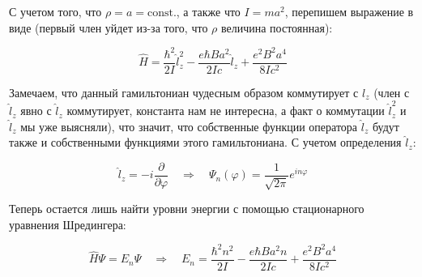 \documentclass[a4paper, 12pt]{article}
\newcommand{\qrq}
{\ensuremath{\quad \Rightarrow \quad}} %
\renewcommand{\phi}{\varphi} %
\begin{document}
С учетом того, что $\rho = a = \text{const.}$, а также что $I = m a^2$, перепишем выражение в виде (первый член уйдет из-за того, что $\rho$ величина постоянная):

\begin{equation*}
	\hat{H} = \frac{\hbar^2}{2 I}\hat{l}^2_z - \frac{e \hbar B a^2}{2 I c} \hat{l}_z + \frac{e^2 B^2 a^4}{8 I c^2}
\end{equation*}

Замечаем, что данный гамильтониан чудесным образом коммутирует с $l_z$ (член с $\hat{l}_z$ явно с $\hat{l}_z$ коммутирует, константа нам не интересна, а факт о коммутации $\hat{l}_z^2$ и $\hat{l}_z$ мы уже выясняли), что значит, что собственные функции оператора $\hat{l}_z$ будут также и собственными функциями этого гамильтониана. С учетом определения $\hat{l}_z$:

\begin{equation*}
	\hat{l}_z = - i \frac{\partial}{\partial \phi} \qrq \boxed{\Psi_n(\phi) = \frac{1}{\sqrt{2\pi}} e^{i n \phi}}
\end{equation*}

Теперь остается лишь найти уровни энергии с помощью стационарного уравнения Шредингера:

\begin{equation*}
	\hat{H} \Psi = E_n \Psi \qrq \boxed{E_n = \frac{\hbar^2 n^2}{2 I} - \frac{e \hbar B a^2 n}{2 I c} + \frac{e^2 B^2 a^4}{8 I c^2}}
\end{equation*}
\end{document}
